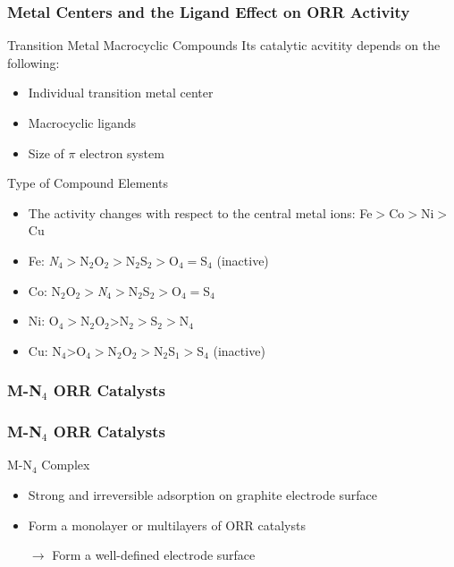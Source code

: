 \documentclass{beamer}
\begin{document}
\begin{frame}
\frametitle{Metal Centers and the Ligand Effect on ORR Activity}
\begin{block}{Transition Metal Macrocyclic Compounds}
Its catalytic acvitity depends on the following:
\begin{itemize}
\item{Individual transition metal center}
\item{Macrocyclic ligands}
\item{Size of $\pi$ electron system}
\end{itemize}
\end{block}

\begin{exampleblock}{Type of Compound Elements}
\begin{itemize}
    \item{The activity changes with respect to the central metal ions: Fe$>$Co$>$Ni$>$Cu}
    \item{Fe:\emph{ N$_4>$}N$_2$O$_2>$N$_2$S$_2>$O$_4=$S$_4$ (inactive)}
    \item{Co: N$_2$O$_2>$\emph{N$_4>$}N$_2$S$_2>$O$_4=$S$_4$}
    \item{Ni: O$_4>$N$_2$O$_2$>N$_2>$S$_2>$N$_4$}
    \item{Cu: N$_4$>O$_4>$N$_2$O$_2>$N$_2$S$_1>$S$_4$ (inactive)}
\end{itemize}
\end{exampleblock}
\end{frame}

\subsubsection{M-N$_4$ ORR Catalysts}
\begin{frame}
\frametitle{M-N$_4$ ORR Catalysts}
\begin{block}{M-N$_4$ Complex}

\begin{itemize}
\item{Strong and irreversible adsorption on graphite electrode surface}
\item{Form a monolayer or multilayers of ORR catalysts}
\item[$\rightarrow$]{ Form a well-defined electrode surface}
\end{itemize}
\end{block}
\end{frame}
\end{document}
